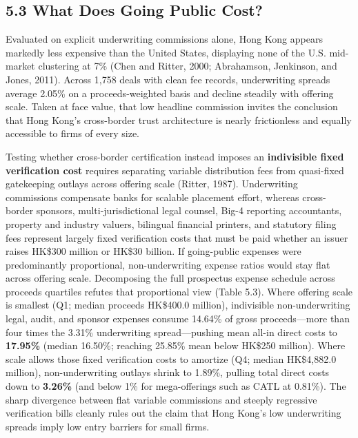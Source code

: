 \documentclass[11pt,letterpaper]{article}
\begin{document}
\subsection*{\texorpdfstring{5.3 What Does Going Public Cost?}{5.3 What Does Going Public Cost?}}
Evaluated on explicit underwriting commissions alone, Hong Kong appears markedly less expensive than the United States, displaying none of the U.S. mid-market clustering at 7\% (Chen and Ritter, 2000; Abrahamson, Jenkinson, and Jones, 2011). Across 1,758 deals with clean fee records, underwriting spreads average 2.05\% on a proceeds-weighted basis and decline steadily with offering scale. Taken at face value, that low headline commission invites the conclusion that Hong Kong's cross-border trust architecture is nearly frictionless and equally accessible to firms of every size.

Testing whether cross-border certification instead imposes an \textbf{indivisible fixed verification cost} requires separating variable distribution fees from quasi-fixed gatekeeping outlays across offering scale (Ritter, 1987). Underwriting commissions compensate banks for scalable placement effort, whereas cross-border sponsors, multi-jurisdictional legal counsel, Big-4 reporting accountants, property and industry valuers, bilingual financial printers, and statutory filing fees represent largely fixed verification costs that must be paid whether an issuer raises HK\$300 million or HK\$30 billion. If going-public expenses were predominantly proportional, non-underwriting expense ratios would stay flat across offering scale. Decomposing the full prospectus expense schedule across proceeds quartiles refutes that proportional view (Table 5.3). Where offering scale is smallest (Q1; median proceeds HK\$400.0 million), indivisible non-underwriting legal, audit, and sponsor expenses consume 14.64\% of gross proceeds—more than four times the 3.31\% underwriting spread—pushing mean all-in direct costs to \textbf{17.95\%} (median 16.50\%; reaching 25.85\% mean below HK\$250 million). Where scale allows those fixed verification costs to amortize (Q4; median HK\$4,882.0 million), non-underwriting outlays shrink to 1.89\%, pulling total direct costs down to \textbf{3.26\%} (and below 1\% for mega-offerings such as CATL at 0.81\%). The sharp divergence between flat variable commissions and steeply regressive verification bills cleanly rules out the claim that Hong Kong's low underwriting spreads imply low entry barriers for small firms.
\end{document}
